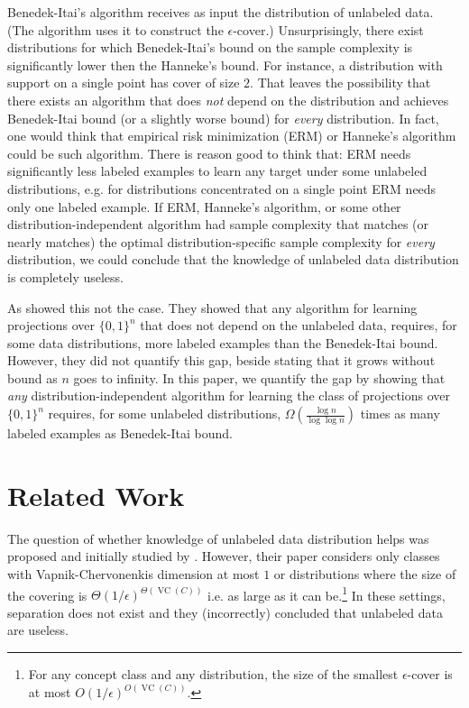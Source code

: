 \documentclass[10pt]{article}
\DeclareMathOperator{\VC}{VC}
\begin{document}
Benedek-Itai's algorithm receives as input the distribution of unlabeled data.
(The algorithm uses it to construct the $\epsilon$-cover.) Unsurprisingly, there
exist distributions for which Benedek-Itai's bound on the sample complexity is
significantly lower then the Hanneke's bound. For instance, a distribution with
support on a single point has cover of size $2$. That leaves the possibility
that there exists an algorithm that does \emph{not} depend on the distribution
and achieves Benedek-Itai bound (or a slightly worse bound) for \emph{every}
distribution. In fact, one would think that empirical risk minimization (ERM) or
Hanneke's algorithm could be such algorithm. There is reason good to think that:
ERM needs significantly less labeled examples to learn any target under some
unlabeled distributions, e.g. for distributions concentrated on a single point
ERM needs only one labeled example. If ERM, Hanneke's algorithm, or some other
distribution-independent algorithm had sample complexity that matches (or nearly
matches) the optimal distribution-specific sample complexity for \emph{every}
distribution, we could conclude that the knowledge of unlabeled data
distribution is completely useless.

As \cite{Darnstadt-Simon-Szorenyi-2013} showed this not the case. They showed
that any algorithm for learning projections over $\{0,1\}^n$ that does not
depend on the unlabeled data, requires, for some data distributions, more
labeled examples than the Benedek-Itai bound. However, they did not quantify
this gap, beside stating that it grows without bound as $n$ goes to infinity.
In this paper, we quantify the gap by showing that \emph{any}
distribution-independent algorithm for learning the class of projections over
$\{0,1\}^n$ requires, for some unlabeled distributions, $\Omega(\frac{\log
n}{\log \log n})$ times as many labeled examples as Benedek-Itai bound.

\section{Related Work}

The question of whether knowledge of unlabeled data distribution helps was
proposed and initially studied by \cite{Ben-David-Lu-Pal-2008}. However, their
paper considers only classes with Vapnik-Chervonenkis dimension at most $1$
or distributions where the size of the covering is
$\Theta(1/\epsilon)^{\Theta(\VC(C))}$ i.e. as large as it can be.\footnote{For
any concept class and any distribution, the size of the smallest
$\epsilon$-cover is at most $O(1/\epsilon)^{O(\VC(C))}$.} In these settings,
separation does not exist and they (incorrectly) concluded that unlabeled data
are useless.
\end{document}
